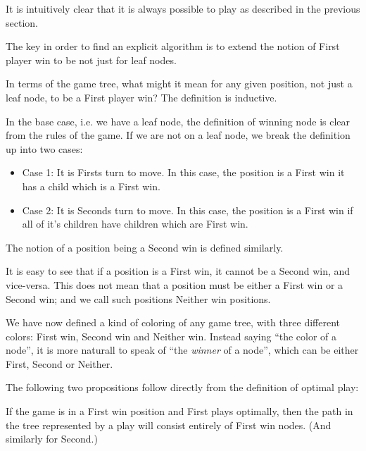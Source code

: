 It is intuitively clear that it is always possible to play as described in the previous section.

The key in order to find an explicit algorithm is to extend the notion of First player win to be not just for leaf nodes.

In terms of the game tree, what might it mean for any given position, not just a leaf node, to be a First player win?
The definition is inductive.

In the base case, i.e. we have a leaf node, the definition of winning node is clear from the rules of the game.
If we are not on a leaf node, we break the definition up into two cases:

\begin{definition}
\label{def:positionclasses}

\begin{itemize}

  \item Case 1: It is Firsts turn to move.
    In this case, the position is a First win it has a child which is a First win.
  \item Case 2: It is Seconds turn to move.
    In this case, the position is a First win if all of it's children have children which are First win.

\end{itemize}

\end{definition}

The notion of a position being a Second win is defined similarly.

It is easy to see that if a position is a First win, it cannot be a Second win, and vice-versa.
This does not mean that a position must be either a First win or a Second win; and we call such positions Neither win positions.

We have now defined a kind of coloring of any game tree, with three different colors: First win, Second win and Neither win.
Instead saying ``the color of a node'', it is more naturall to speak of ``the \emph{winner} of a node'', which can be either First, Second or Neither.

The following two propositions follow directly from the definition of optimal play:

\begin{proposition}
If the game is in a First win position and First plays optimally, then the path in the tree represented by a play will consist entirely of First win nodes.
(And similarly for Second.)
\end{proposition}

